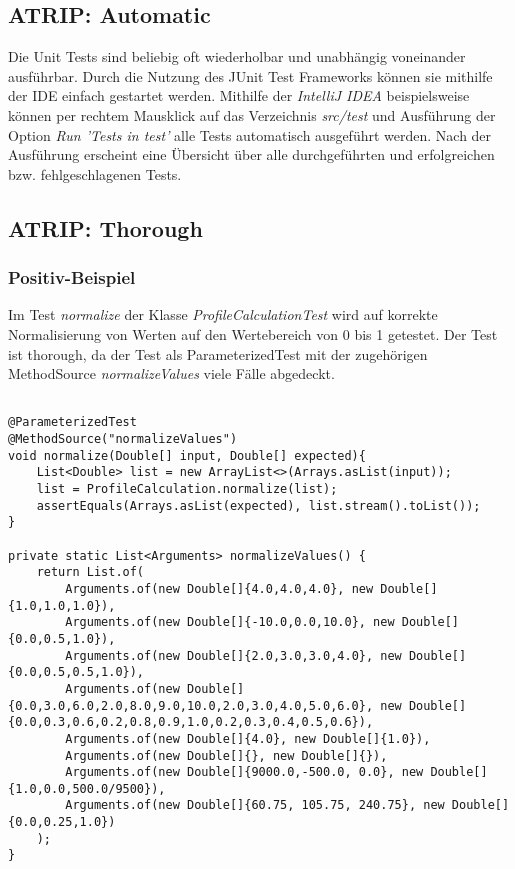 \subsection{ATRIP: Automatic}

Die Unit Tests sind beliebig oft wiederholbar und unabhängig voneinander ausführbar. Durch die Nutzung des JUnit Test Frameworks können sie mithilfe der IDE einfach gestartet werden.
Mithilfe der \textit{IntelliJ IDEA} beispielsweise können per rechtem Mausklick auf das Verzeichnis \textit{src/test} und Ausführung der Option  \textit{Run 'Tests in test'} alle Tests automatisch ausgeführt werden.
Nach der Ausführung erscheint eine Übersicht über alle durchgeführten und erfolgreichen bzw. fehlgeschlagenen Tests.

\subsection{ATRIP: Thorough}

\subsubsection{Positiv-Beispiel}

Im Test \textit{normalize} der Klasse \textit{ProfileCalculationTest} wird auf korrekte Normalisierung von Werten auf den Wertebereich von 0 bis 1 getestet.
Der Test ist thorough, da der Test als ParameterizedTest mit der zugehörigen MethodSource \textit{normalizeValues} viele Fälle abgedeckt.

\begin{lstlisting}

@ParameterizedTest
@MethodSource("normalizeValues")
void normalize(Double[] input, Double[] expected){
	List<Double> list = new ArrayList<>(Arrays.asList(input));
	list = ProfileCalculation.normalize(list);
	assertEquals(Arrays.asList(expected), list.stream().toList());
}

private static List<Arguments> normalizeValues() {
	return List.of(
		Arguments.of(new Double[]{4.0,4.0,4.0}, new Double[]{1.0,1.0,1.0}),
		Arguments.of(new Double[]{-10.0,0.0,10.0}, new Double[]{0.0,0.5,1.0}),
		Arguments.of(new Double[]{2.0,3.0,3.0,4.0}, new Double[]{0.0,0.5,0.5,1.0}),
		Arguments.of(new Double[]{0.0,3.0,6.0,2.0,8.0,9.0,10.0,2.0,3.0,4.0,5.0,6.0}, new Double[]{0.0,0.3,0.6,0.2,0.8,0.9,1.0,0.2,0.3,0.4,0.5,0.6}),
		Arguments.of(new Double[]{4.0}, new Double[]{1.0}),
		Arguments.of(new Double[]{}, new Double[]{}),
		Arguments.of(new Double[]{9000.0,-500.0, 0.0}, new Double[]{1.0,0.0,500.0/9500}),
		Arguments.of(new Double[]{60.75, 105.75, 240.75}, new Double[]{0.0,0.25,1.0})
	);
}

\end{lstlisting}

